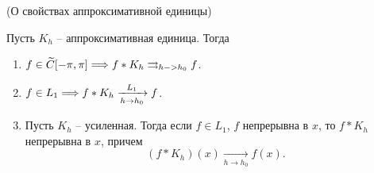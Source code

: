 \begin{theorem}(О свойствах аппроксимативной единицы)
    
    Пусть $K_h$ -- аппроксимативная единица. Тогда
    \begin{enumerate}
        \item $f \in \widetilde{C}[-\pi, \pi] \Longrightarrow f \ast K_h \rightrightarrows_{h -> h_0} f$.
        \item $f \in L_1 \Longrightarrow f \ast K_h \xrightarrow[h \to h_0]{L_1} f$.
        \item Пусть $K_h$ -- усиленная. Тогда если $f \in L_1$, $f$ непрерывна в
            $x$, то $f \ast K_h$ непрерывна в $x$, причем
            \[
                (f \ast K_h)(x) \xrightarrow[h \to h_0]{} f(x)
            .\]
    \end{enumerate}
\end{theorem}
